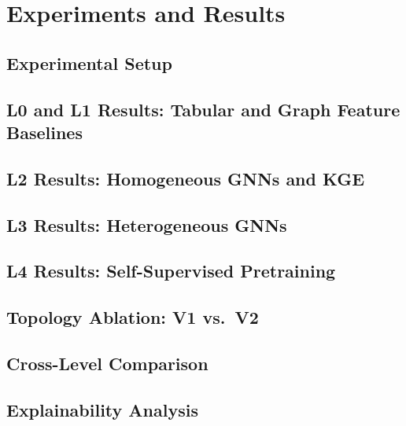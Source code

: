 \chapter{Experiments and Results}
\label{chap:experiments}

\section{Experimental Setup}
\label{sec:exp-setup}

\section{L0 and L1 Results: Tabular and Graph Feature Baselines}
\label{sec:results-l0-l1}

\section{L2 Results: Homogeneous GNNs and KGE}
\label{sec:results-l2}

\section{L3 Results: Heterogeneous GNNs}
\label{sec:results-l3}

\section{L4 Results: Self-Supervised Pretraining}
\label{sec:results-l4}

\section{Topology Ablation: V1 vs.\ V2}
\label{sec:topology-ablation}

\section{Cross-Level Comparison}
\label{sec:cross-level}

\section{Explainability Analysis}
\label{sec:explainability-results}
